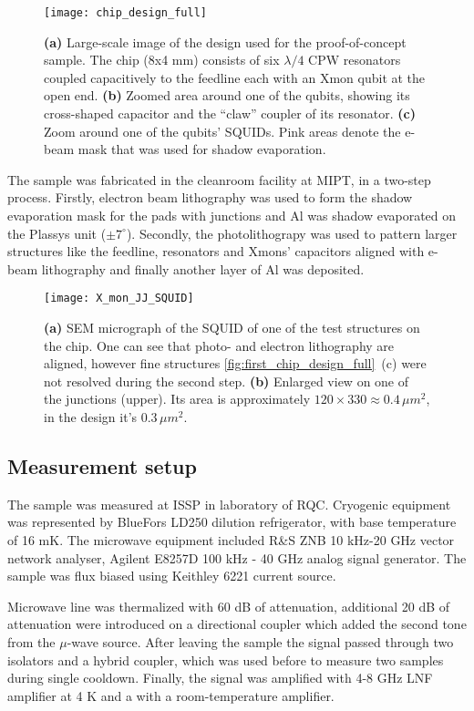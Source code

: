 \begin{figure}[h!]
\centering
\texttt{[image: chip\_design\_full]}
\caption{\textbf{(a)} Large-scale image of the design used for the proof-of-concept sample. The chip (8x4 mm) consists of six $\lambda/4$ CPW resonators coupled capacitively to the feedline each with an Xmon qubit at the open end. \textbf{(b)} Zoomed area around one of the qubits, showing its cross-shaped capacitor and the ``claw'' coupler of its resonator. \textbf{(c)} Zoom around one of the qubits' SQUIDs. Pink areas denote the e-beam mask that was used for shadow evaporation.}
\label{fig:first_chip_design_full}
\end{figure}

The sample was fabricated in the cleanroom facility at MIPT, in a two-step process. Firstly, electron beam lithography was used to form the shadow evaporation mask for the pads with junctions and Al was shadow evaporated on the Plassys unit ($\pm 7^\circ$). Secondly, the photolithograpy was used to pattern larger structures like the feedline, resonators and Xmons' capacitors aligned with e-beam lithography and finally another layer of Al was deposited.	

\begin{figure}
\centering
\texttt{[image: X\_mon\_JJ\_SQUID]}
\caption{\textbf{(a)} SEM micrograph of the SQUID of one of the test structures on the chip. One can see that photo- and electron lithography are aligned, however fine structures \autoref{fig:first_chip_design_full}~(c) were not resolved during the second step. \textbf{(b)} Enlarged view on one of the junctions (upper). Its area is approximately $120\times 330\approx 0.4\, \mu m^2$, in the design it's $0.3\,\mu m^2$.} 
\end{figure}

\subsection{Measurement setup}

The sample was measured at ISSP in laboratory of RQC. Cryogenic equipment was represented by BlueFors LD250 dilution refrigerator, with base temperature of 16 mK. The microwave equipment included R\&S ZNB 10 kHz-20 GHz vector network analyser,  Agilent E8257D 100 kHz - 40 GHz analog signal generator. The sample was flux biased using Keithley 6221 current source.

Microwave line was thermalized with 60 dB of attenuation, additional 20 dB of attenuation were introduced on a directional coupler which added the second tone from the $\mu$-wave source. After leaving the sample the signal passed through two isolators and a hybrid coupler, which was used before to measure two samples during single cooldown. Finally, the signal was amplified with 4-8 GHz LNF amplifier at 4 K and a with a room-temperature amplifier.

